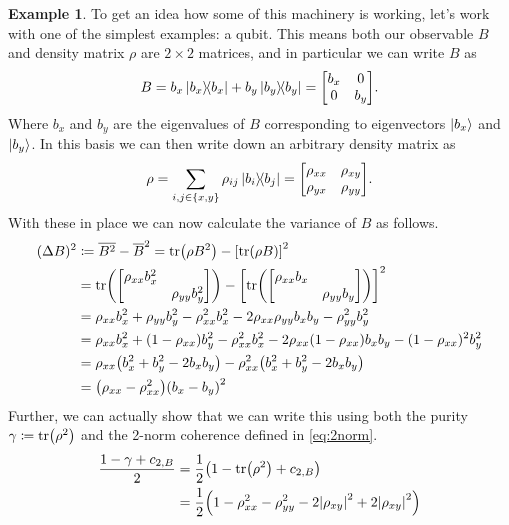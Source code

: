 \documentclass[11pt,english]{article}
\theoremstyle{definition}
\newtheorem{example}{Example}[section]
\newcommand{\twonormE}[1][\rho]{c_{2,B}}
\begin{document}
\begin{example}\label{ex:qubits}
	To get an idea how some of this machinery is working, let's work with one of the simplest examples: a qubit. This means both our observable $B$ and density matrix $\rho$ are $2\times 2$ matrices, and in particular we can write $B$ as
	\begin{equation*}
		B = b_x\ketbra{b_x} + b_y\ketbra{b_y} = \mqty[b_x & 0 \\ 0 & b_y].
	\end{equation*}
	Where $b_x$ and $b_y$ are the eigenvalues of $B$ corresponding to eigenvectors $\ket{b_x}$ and $\ket{b_y}$. In this basis we can then write down an arbitrary density matrix as
	\begin{equation*}
		\rho = \sum_{i, j\in \{x, y\}}\rho_{ij}\ketbra{b_i}{b_j} = \mqty[\rho_{xx} & \rho_{xy} \\ \rho_{yx} & \rho_{yy}].
	\end{equation*}
	With these in place we can now calculate the variance of $B$ as follows.
	\begin{align*}
		(\Delta B)^2 & \coloneqq \overline{B^2} - \overline{B}^2 = \tr(\rho B^2) - \qty[\tr(\rho B)]^2                                        \\
		             & = \tr(\mqty[\dmat{\rho_{xx}b_x^2, \rho_{yy}b_y^2}]) - \qty[\tr(\mqty[\dmat{\rho_{xx}b_x, \rho_{yy}b_y}])]^2            \\
		             & = \rho_{xx}b_x^2 + \rho_{yy}b_y^2 - \rho_{xx}^2b_x^2 - 2\rho_{xx}\rho_{yy}b_x b_y - \rho_{yy}^2b_y^2                   \\
		             & = \rho_{xx}b_x^2 + (1 - \rho_{xx})b_y^2 - \rho_{xx}^2b_x^2 - 2\rho_{xx}(1 - \rho_{xx})b_x b_y - (1 - \rho_{xx})^2b_y^2 \\
		             & = \rho_{xx}\qty(b_x^2 + b_y^2 - 2b_x b_y) - \rho_{xx}^2\qty(b_x^2 + b_y^2 - 2b_x b_y)                                  \\
		             & = \qty(\rho_{xx} - \rho_{xx}^2)\qty(b_x - b_y)^2
	\end{align*}
	Further, we can actually show that we can write this using both the purity $\gamma\coloneqq\tr(\rho^2)$ and the 2-norm coherence defined in \cref{eq:2norm}.
	\begin{align*}
		\frac{1 - \gamma + \twonormE}{2} & = \frac{1}{2}\qty(1 - \tr(\rho^2) + \twonormE)                                             \\
		                                 & = \frac{1}{2}\qty(1 - \rho_{xx}^2 - \rho_{yy}^2 - 2\abs{\rho_{xy}}^2 + 2\abs{\rho_{xy}}^2) \\

\end{align*}
\end{example}
\end{document}
